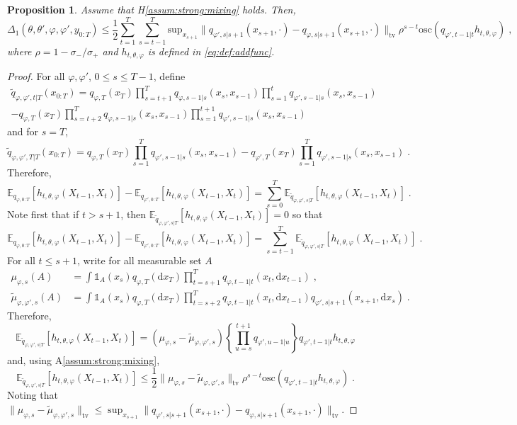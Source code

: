 \documentclass{article}
\newtheorem{proposition}[theorem]{Proposition}
\newcommand{\udlow}{\sigma_-}
\newcommand{\udup}{\sigma_+}
\newcommand{\1}{\mathbbm{1}}
\newcommand{\rmd}{\ensuremath{\mathrm{d}}}
\newcommand{\eqsp}{\;}
\begin{document}
\begin{proposition}
Assume that H\ref{assum:strong:mixing} holds. Then,
$$
\Delta_1(\theta, \theta', \varphi, \varphi', y_{0:T}) \leq \frac{1}{2}\sum_{t=1}^T\sum_{s=t-1}^T \mathrm{sup}_{x_{s+1}} \|q_{\varphi',s|s+1}(x_{s+1},\cdot)-q_{\varphi,s|s+1}(x_{s+1},\cdot)\|_{\mathrm{tv}}\rho^{s-t}\mathrm{osc}\left(q_{\varphi',t-1|t}h_{t,\theta,\varphi}\right) \eqsp,
$$
where $\rho = 1-\udlow/\udup$ and $h_{t,\theta,\varphi}$ is defined in \eqref{eq:def:addfunc}.
\end{proposition}
\begin{proof}
For all $\varphi,\varphi'$, $0\leq s \leq T-1$, define
\begin{multline*}
\tilde q_{\varphi,\varphi',t|T}(x_{0:T}) = q_{\varphi,T}(x_T)\prod_{s=t+1}^Tq_{\varphi,s-1|s}(x_s,x_{s-1})\prod_{s=1}^tq_{\varphi',s-1|s}(x_s,x_{s-1}) \\
- q_{\varphi,T}(x_T)\prod_{s=t+2}^Tq_{\varphi,s-1|s}(x_s,x_{s-1})\prod_{s=1}^{t+1}q_{\varphi',s-1|s}(x_s,x_{s-1})
\end{multline*}
and for $s=T$,
$$
\tilde q_{\varphi,\varphi',T|T}(x_{0:T}) = q_{\varphi,T}(x_T)\prod_{s=1}^Tq_{\varphi',s-1|s}(x_s,x_{s-1}) 
- q_{\varphi',T}(x_T)\prod_{s=1}^Tq_{\varphi',s-1|s}(x_s,x_{s-1})\eqsp.
$$
Therefore,
$$
\mathbb{E}_{q_{\varphi,0:T}}\left[h_{t,\theta,\varphi}(X_{t-1},X_t)\right] - \mathbb{E}_{q_{\varphi',0:T}}\left[h_{t,\theta,\varphi}(X_{t-1},X_t)\right] = \sum_{s=0}^T \mathbb{E}_{\tilde q_{\varphi,\varphi',s|T}}\left[h_{t,\theta,\varphi}(X_{t-1},X_t)\right] \eqsp.
$$
Note first that if $t> s+1$, then $\mathbb{E}_{\tilde q_{\varphi,\varphi',s|T}}\left[h_{t,\theta,\varphi}(X_{t-1},X_t)\right] = 0$ so that
$$
\mathbb{E}_{q_{\varphi,0:T}}\left[h_{t,\theta,\varphi}(X_{t-1},X_t)\right] - \mathbb{E}_{q_{\varphi',0:T}}\left[h_{t,\theta,\varphi}(X_{t-1},X_t)\right] = \sum_{s=t-1}^T \mathbb{E}_{\tilde q_{\varphi,\varphi',s|T}}\left[h_{t,\theta,\varphi}(X_{t-1},X_t)\right] \eqsp.
$$
For all $t\leq s+1$, write for all measurable set $A$
\begin{align*}
\mu_{\varphi,s}(A) &= \int \mathds{1}_A(x_s) q_{\varphi,T}(\rmd x_T)\prod_{t=s+1}^Tq_{\varphi,t-1|t}(x_t,\rmd x_{t-1})\eqsp,\\
\tilde\mu_{\varphi,\varphi',s}(A) &= \int \mathds{1}_A(x_s) q_{\varphi,T}(\rmd x_T)\prod_{t=s+2}^Tq_{\varphi,t-1|t}(x_t,\rmd x_{t-1})q_{\varphi',s|s+1}(x_{s+1},\rmd x_{s})\eqsp.
\end{align*}
Therefore,
$$
\mathbb{E}_{\tilde q_{\varphi,\varphi',s|T}}\left[h_{t,\theta,\varphi}(X_{t-1},X_t)\right] = \left(\mu_{\varphi,s} - \tilde\mu_{\varphi,\varphi',s}\right)\left\{\prod_{u=s}^{t+1}q_{\varphi',u-1|u}\right\}q_{\varphi',t-1|t}h_{t,\theta,\varphi}
$$
and, using A\ref{assum:strong:mixing},
$$
\mathbb{E}_{\tilde q_{\varphi,\varphi',s|T}}\left[h_{t,\theta,\varphi}(X_{t-1},X_t)\right]  \leq \frac{1}{2}\|\mu_{\varphi,s}-\tilde\mu_{\varphi,\varphi',s}\|_{\mathrm{tv}}\rho^{s-t}\mathrm{osc}\left(q_{\varphi',t-1|t}h_{t,\theta,\varphi}\right)\eqsp.
$$
Noting that $\|\mu_{\varphi,s}-\tilde\mu_{\varphi,\varphi',s}\|_{\mathrm{tv}} \leq \sup_{x_{s+1}} \|q_{\varphi',s|s+1}(x_{s+1},\cdot)-q_{\varphi,s|s+1}(x_{s+1},\cdot)\|_{\mathrm{tv}}$.
\end{proof}
\end{document}
